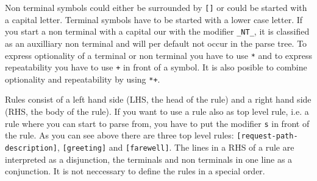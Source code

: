 Non terminal symbols could either be surrounded by \texttt{[]} or could be
started with a capital letter. Terminal symbols have to be started
with a lower case letter. If you start a non terminal with a capital
our with the modifier \texttt{\_NT\_}, it is classified as an auxilliary non
terminal and will per default not occur in the parse tree. To express
optionality of a terminal or non terminal you have to use \texttt{*} and to
express repeatability you have to use \texttt{+} in front of a symbol. It is
also posible to combine optionality and repeatability by using \texttt{*+}.

Rules consist of a left hand side (LHS, the head of the rule) and a
right hand side (RHS, the body of the rule). If you want to use a rule
also as top level rule, i.e. a rule where you can start to parse from,
you have to put the modifier \texttt{s} in front of the rule. As you
can see above there are three top level rules:
\texttt{[request-path-description]}, \texttt{[greeting]} and
\texttt{[farewell]}. The lines in a RHS of a rule are interpreted as a
disjunction, the terminals and non terminals in one line as a
conjunction. It is not neccessary to define the rules in a special
order.

